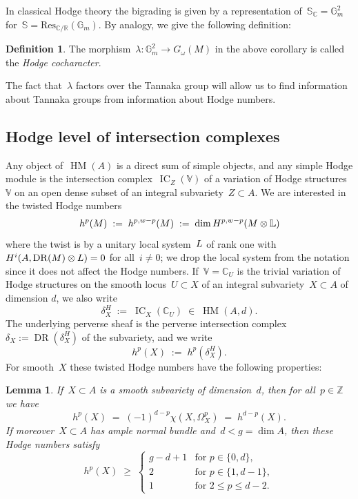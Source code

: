 \documentclass[a4paper]{amsart}
\newcommand{\bbC}{\mathbb{C}}
\newcommand{\bbG}{\mathbb{G}}
\newcommand{\bbL}{\mathbb{L}}
\newcommand{\bbR}{\mathbb{R}}
\newcommand{\bbS}{\mathbb{S}}
\newcommand{\bbV}{\mathbb{V}}
\newcommand{\bbZ}{\mathbb{Z}}
\newcommand{\rH}{\textup{H}}
\newcommand{\rL}{\textup{L}}
\DeclareMathOperator{\IC}{IC}
\DeclareMathOperator{\DR}{DR}
\DeclareMathOperator{\HM}{HM}
\renewcommand{\le}{\leqslant}
\renewcommand{\ge}{\geqslant}
\theoremstyle{plain}
\newtheorem{lemma}[theorem]{Lemma}
\theoremstyle{definition}
\newtheorem{definition}[theorem]{Definition}
\numberwithin{equation}{section}
\begin{document}
In classical Hodge theory the bigrading is given by a representation of~$\bbS_\bbC = \bbG_m^2$ for~$\bbS = \mathrm{Res}_{\bbC/\bbR}(\bbG_m)$. By analogy, we give the following definition:

\begin{definition} The morphism~$\lambda\colon \bbG_m^2 \to G_\omega(M)$ in the above corollary is called the \emph{Hodge cocharacter}.
\end{definition}

The fact that~$\lambda$ factors over the Tannaka group will allow us to find information about Tannaka groups from information about Hodge numbers.


\subsection{Hodge level of intersection complexes} \label{sec:hodge-level-of-IC} Any object of~$\HM(A)$ is a direct sum of simple objects, and any simple Hodge module is the intersection complex~$\IC_Z(\bbV)$ of a variation of Hodge structures~$\bbV$ on an open dense subset of an integral subvariety~$Z\subset A$. We are interested in the twisted Hodge numbers
%
\[
 h^p(M) \;:=\; h^{p, w-p}(M) \;:=\; \dim \rH^{p, w-p}(M\otimes \bbL)
\]
%
where the twist is by a unitary local system~$\rL$ of rank one with~$\rH^i(A, \DR(M)\otimes L)=0$ for all~$i\neq 0$; we drop the local system from the notation since it does not affect the Hodge numbers.
%
If~$\bbV = \bbC_U$ is the trivial variation of Hodge structures on the smooth locus~$U\subset X$ of an integral subvariety~$X\subset A$ of dimension $d$, we also write 
%
\[
\delta_X^H \;:=\; \IC_X(\bbC_U) \;\in\; \HM(A, d).
\]
%
The underlying perverse sheaf is the perverse intersection complex~$\delta_X := \DR(\delta_X^H)$ of the subvariety, and we write
%
\[
 h^{p}(X) \;:=\; h^p(\delta_X^H).
\]
%
For smooth~$X$ these twisted Hodge numbers have the following properties:

\begin{lemma} \label{lem:hodge-estimate}
If~$X \subset A$ is a smooth subvariety of dimension~$d$, then for all~$p\in \bbZ$ we have 
%
\[ h^p(X) \;=\; (-1)^{d-p} \chi(X, \Omega^p_X) \;=\; h^{d-p}(X). \]
%
If moreover~$X\subset A$ has ample normal bundle and~$d<g=\dim A$, then these Hodge numbers satisfy
%
\[ h^p(X) \;\ge\; 
\begin{cases} 
g-d + 1 & \text{for~$p\in \{0,d\}$}, \\[0.1em] 
2 & \text{for~$p\in \{1,d-1\}$}, \\[0.1em] 
1 & \text{for~$2 \le p \le d-2$.}
\end{cases} 
\]
\end{lemma} 
\end{document}
